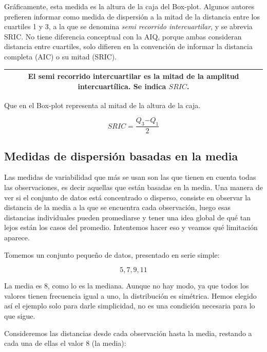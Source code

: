\documentclass[]{book}
\begin{document}
Gráficamente, esta medida es la altura de la caja del Box-plot. Algunos autores prefieren informar como medida de dispersión a la mitad de la distancia entre los cuartiles 1 y 3, a la que se denomina \emph{semi recorrido intercuartilar}, y se abrevia SRIC. No tiene diferencia conceptual con la AIQ, porque ambas consideran distancia entre cuartiles, solo difieren en la convención de informar la distancia completa (AIC) o su mitad (SRIC).

\begin{longtable}[]{@{}c@{}}
\toprule
\endhead
\begin{minipage}[t]{0.97\columnwidth}\centering
El \textbf{semi recorrido intercuartilar} es la mitad de la amplitud intercuartílica. Se indica \(SRIC\).\strut
\end{minipage}\tabularnewline
\bottomrule
\end{longtable}

Que en el Box-plot representa al mitad de la altura de la caja.

\[SRIC = \frac{Q_{3}{- Q}_{1}}{2}\]

\hypertarget{medidas-de-dispersiuxf3n-basadas-en-la-media}{%
\subsection{Medidas de dispersión basadas en la media}\label{medidas-de-dispersiuxf3n-basadas-en-la-media}}

Las medidas de variabilidad que más se usan son las que tienen en cuenta
todas las observaciones, es decir aquellas que están basadas en la
media. Una manera de ver si el conjunto de datos está concentrado o
disperso, consiste en observar la distancia de la media a la que se
encuentra cada observación, luego esas distancias individuales pueden
promediarse y tener una idea global de qué tan lejos están los casos del
promedio. Intentemos hacer eso y veamos qué limitación aparece.

Tomemos un conjunto pequeño de datos, presentado en serie simple:

\[5, 7, 9, 11\]

La media es 8, como lo es la mediana. Aunque no hay modo, ya que todos
los valores tienen frecuencia igual a uno, la distribución es simétrica.
Hemos elegido así el ejemplo solo para darle simplicidad, no es una
condición necesaria para lo que sigue.

Consideremos las distancias desde cada observación hasta la media,
restando a cada una de ellas el valor 8 (la media):
\end{document}
